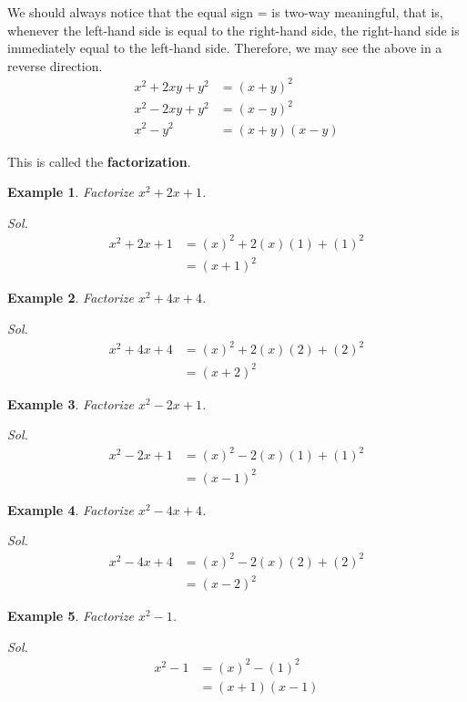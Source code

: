 \documentclass[12pt]{article}
\newtheorem{example}{Example}
\begin{document}
    We should always notice that the equal sign = is two-way meaningful, that is, whenever the left-hand side is equal to the right-hand side, the right-hand side is immediately equal to the left-hand side. Therefore, we may see the above in a reverse direction.\begin{align*}
        x^2+2xy+y^2&=(x+y)^2\\
        x^2-2xy+y^2&=(x-y)^2\\
        x^2-y^2&=(x+y)(x-y)
    \end{align*}

    This is called the \textbf{factorization}.

    \begin{example}
        Factorize $x^2+2x+1$.
    \end{example}
    \textit{ Sol. }\begin{align*}
        x^2+2x+1&=(x)^2+2(x)(1)+(1)^2\\
        &=(x+1)^2
    \end{align*}

    \begin{example}
        Factorize $x^2+4x+4$.
    \end{example}
    \textit{ Sol. }\begin{align*}
        x^2+4x+4&=(x)^2+2(x)(2)+(2)^2\\
        &=(x+2)^2
    \end{align*}

    \begin{example}
        Factorize $x^2-2x+1$.
    \end{example}
    \textit{ Sol. }\begin{align*}
        x^2-2x+1&=(x)^2-2(x)(1)+(1)^2\\
        &=(x-1)^2
    \end{align*}

    \begin{example}
        Factorize $x^2-4x+4$.
    \end{example}
    \textit{ Sol. }\begin{align*}
        x^2-4x+4&=(x)^2-2(x)(2)+(2)^2\\
        &=(x-2)^2
    \end{align*}

    \begin{example}
        Factorize $x^2-1$.
    \end{example}
    \textit{ Sol. }\begin{align*}
        x^2-1&=(x)^2-(1)^2\\
        &=(x+1)(x-1)
    \end{align*}
\end{document}
